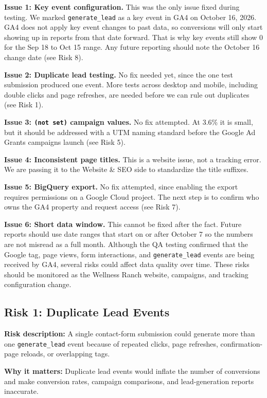 \documentclass[
  letterpaper,
  DIV=11,
  numbers=noendperiod]{scrartcl}
\begin{document}
\textbf{Issue 1: Key event configuration.} This was the only issue fixed
during testing. We marked \texttt{generate\_lead} as a key event in GA4
on October 16, 2026. GA4 does not apply key event changes to past data,
so conversions will only start showing up in reports from that date
forward. That is why key events still show 0 for the Sep 18 to Oct 15
range. Any future reporting should note the October 16 change date (see
Risk 8).

\textbf{Issue 2: Duplicate lead testing.} No fix needed yet, since the
one test submission produced one event. More tests across desktop and
mobile, including double clicks and page refreshes, are needed before we
can rule out duplicates (see Risk 1).

\textbf{Issue 3: \texttt{(not\ set)} campaign values.} No fix attempted.
At 3.6\% it is small, but it should be addressed with a UTM naming
standard before the Google Ad Grants campaigns launch (see Risk 5).

\textbf{Issue 4: Inconsistent page titles.} This is a website issue, not
a tracking error. We are passing it to the Website \& SEO side to
standardize the title suffixes.

\textbf{Issue 5: BigQuery export.} No fix attempted, since enabling the
export requires permissions on a Google Cloud project. The next step is
to confirm who owns the GA4 property and request access (see Risk 7).

\textbf{Issue 6: Short data window.} This cannot be fixed after the
fact. Future reports should use date ranges that start on or after
October 7 so the numbers are not misread as a full month. Although the
QA testing confirmed that the Google tag, page views, form interactions,
and \texttt{generate\_lead} events are being received by GA4, several
risks could affect data quality over time. These risks should be
monitored as the Wellness Ranch website, campaigns, and tracking
configuration change.

\subsection{Risk 1: Duplicate Lead
Events}\label{risk-1-duplicate-lead-events}

\textbf{Risk description:} A single contact-form submission could
generate more than one \texttt{generate\_lead} event because of repeated
clicks, page refreshes, confirmation-page reloads, or overlapping tags.

\textbf{Why it matters:} Duplicate lead events would inflate the number
of conversions and make conversion rates, campaign comparisons, and
lead-generation reports inaccurate.
\end{document}
